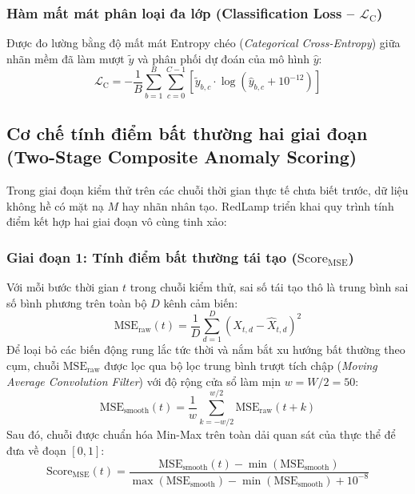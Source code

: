 \documentclass[11pt,journal,onecolumn]{IEEEtran}
\begin{document}
\subsubsection{Hàm mất mát phân loại đa lớp (Classification Loss -- $\mathcal{L}_{\text{C}}$)}
Được đo lường bằng độ mất mát Entropy chéo (\textit{Categorical Cross-Entropy}) giữa nhãn mềm đã làm mượt $\tilde{y}$ và phân phối dự đoán của mô hình $\hat{y}$:
\begin{equation}
\label{eq:loss_c}
\mathcal{L}_{\text{C}} = - \frac{1}{B} \sum_{b=1}^B \sum_{c=0}^{C-1} \left[ \tilde{y}_{b,c} \cdot \log( \hat{y}_{b,c} + 10^{-12} ) \right]
\end{equation}

\subsection{Cơ chế tính điểm bất thường hai giai đoạn (Two-Stage Composite Anomaly Scoring)}
Trong giai đoạn kiểm thử trên các chuỗi thời gian thực tế chưa biết trước, dữ liệu không hề có mặt nạ $M$ hay nhãn nhân tạo. RedLamp triển khai quy trình tính điểm kết hợp hai giai đoạn vô cùng tinh xảo:

\subsubsection{Giai đoạn 1: Tính điểm bất thường tái tạo ($\text{Score}_{\text{MSE}}$)}
Với mỗi bước thời gian $t$ trong chuỗi kiểm thử, sai số tái tạo thô là trung bình sai số bình phương trên toàn bộ $D$ kênh cảm biến:
\begin{equation}
\text{MSE}_{\text{raw}}(t) = \frac{1}{D} \sum_{d=1}^D ( X_{t, d} - \hat{X}_{t, d} )^2
\end{equation}
Để loại bỏ các biến động rung lắc tức thời và nắm bắt xu hướng bất thường theo cụm, chuỗi $\text{MSE}_{\text{raw}}$ được lọc qua bộ lọc trung bình trượt tích chập (\textit{Moving Average Convolution Filter}) với độ rộng cửa sổ làm mịn $w = W / 2 = 50$:
\begin{equation}
\text{MSE}_{\text{smooth}}(t) = \frac{1}{w} \sum_{k = -w/2}^{w/2} \text{MSE}_{\text{raw}}(t + k)
\end{equation}
Sau đó, chuỗi được chuẩn hóa Min-Max trên toàn dải quan sát của thực thể để đưa về đoạn $[0, 1]$:
\begin{equation}
\text{Score}_{\text{MSE}}(t) = \frac{\text{MSE}_{\text{smooth}}(t) - \min(\text{MSE}_{\text{smooth}})}{\max(\text{MSE}_{\text{smooth}}) - \min(\text{MSE}_{\text{smooth}}) + 10^{-8}}
\end{equation}
\end{document}
